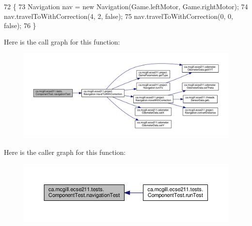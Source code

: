 \begin{DoxyCode}
72                                                                 \{
73     Navigation nav = \textcolor{keyword}{new} Navigation(Game.leftMotor, Game.rightMotor);
74     nav.travelToWithCorrection(4, 2, \textcolor{keyword}{false});
75     nav.travelToWithCorrection(0, 0, \textcolor{keyword}{false});
76   \}
\end{DoxyCode}
Here is the call graph for this function\+:\nopagebreak
\begin{figure}[H]
\begin{center}
\leavevmode
\includegraphics[width=350pt]{enumca_1_1mcgill_1_1ecse211_1_1tests_1_1_component_test_aa40592bb550b3526402faddbc0d890c7_cgraph}
\end{center}
\end{figure}
Here is the caller graph for this function\+:\nopagebreak
\begin{figure}[H]
\begin{center}
\leavevmode
\includegraphics[width=350pt]{enumca_1_1mcgill_1_1ecse211_1_1tests_1_1_component_test_aa40592bb550b3526402faddbc0d890c7_icgraph}
\end{center}
\end{figure}
\mbox{\label{enumca_1_1mcgill_1_1ecse211_1_1tests_1_1_component_test_a1ecca45b47067d825683cf46dcf22b62}} 
